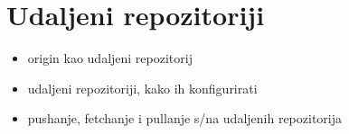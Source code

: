 \chapter*{Udaljeni repozitoriji}

\label{udaljeni_repozitoriji}

\begin{itemize}
   \item origin kao udaljeni repozitorij
   \item udaljeni repozitoriji, kako ih konfigurirati
   \item pushanje, fetchanje i pullanje s/na udaljenih repozitorija
\end{itemize}


